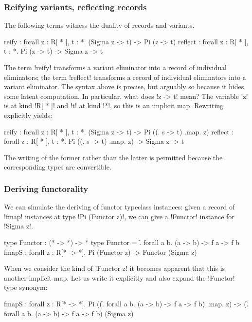 \documentclass[sigplan,10pt,anonymous,review]{acmart}\settopmatter{printfolios=true,printccs=false,printacmref=false}
\begin{document}
\subsubsection{Reifying variants, reflecting records} The following \RO terms witness the duality of records and variants. 

\begin{rosi}
reify : forall z : R[ * ], t : *. 
        (Sigma z -> t) -> Pi (z -> t)
reflect : forall z : R[ * ], t : *. 
          Pi (z -> t) -> Sigma z -> t
\end{rosi}

The term !reify! transforms a variant eliminator into a record of individual eliminators; the term !reflect! transforms a record of individual eliminators into a variant eliminator. The syntax above is precise, but arguably so because it hides some latent computation. In particular, what does !z -> t! mean? The variable !z! is at kind !R[ * ]! and !t! at kind !*!, so this is an implicit map. Rewriting explicitly yields: 

\begin{rosi}
  reify : forall z : R[ * ], t : *. 
          (Sigma z -> t) -> Pi ((\s. s -> t) .map. z)
reflect : forall z : R[ * ], t : *. 
          Pi ((\s. s -> t) .map. z) -> Sigma z -> t
\end{rosi}

\Ni The writing of the former rather than the latter is permitted because the corresponding types are convertible.


\subsubsection{Deriving functorality} We can simulate the deriving of functor typeclass instances: given a record of !fmap! instances at type !Pi (Functor z)!, we can give a !Functor! instance for !Sigma z!. 

\begin{rosi}
type Functor : (* -> *) -> *
type Functor = \f. forall a b. (a -> b) -> f a -> f b
fmapS : forall z : R[* -> *]. 
        Pi (Functor z) -> Functor (Sigma z)
\end{rosi}

\Ni When we consider the kind of !Functor z! it becomes apparent that this is another implicit map. Let us write it explicitly and also expand the !Functor! type synonym:

\begin{rosi}
fmapS : forall z : R[* -> *]. 
      Pi ((\f. forall a b. 
        (a -> b) -> f a -> f b) .map. z) -> 
      (\f. forall a b. (a -> b) -> f a -> f b) (Sigma z)
\end{rosi}
\end{document}
